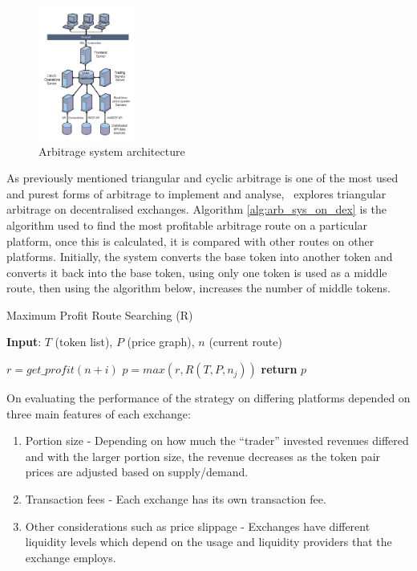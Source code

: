\begin{figure}[!htb]
    \centering
    \includegraphics[width=0.28\textwidth]{background/Images/Arbitrage-Architecture.png}
    \caption{Arbitrage system architecture~\cite{PAUNACristian2018ATSf}}
\end{figure}

\noindent  As previously mentioned triangular and cyclic arbitrage is one of the most used and purest forms of arbitrage to implement and analyse,~\cite{boonpeam2021arbitrage} explores triangular arbitrage on decentralised exchanges. Algorithm \ref{alg:arb_sys_on_dex} is the algorithm used to find the most profitable arbitrage route on a particular platform, once this is calculated, it is compared with other routes on other platforms. Initially, the system converts the base token into another token and converts it back into the base token, using only one token is used as a middle route, then using the algorithm below, increases the number of middle tokens.

\begin{algorithm}
    \caption{Maximum Profit Route Searching (R)}\label{alg:arb_sys_on_dex}
    \textbf{Input}: $T$ (token list), $P$ (price graph), $n$ (current route)
    \begin{algorithmic}
        \State $r = get\_profit(n+i)$
        \State $p = max(r, R(T, P, n_j))$
        \EndFor
        \EndFor
        \State \textbf{return} $p$
    \end{algorithmic}
\end{algorithm}

\noindent On evaluating the performance of the strategy on differing platforms depended on three main features of each exchange:
\begin{enumerate}
    \item Portion size - Depending on how much the ``trader'' invested revenues differed and with the larger portion size, the revenue decreases as the token pair prices are adjusted based on supply/demand.
    \item Transaction fees - Each exchange has its own transaction fee.
    \item Other considerations such as price slippage - Exchanges have different liquidity levels which depend on the usage and liquidity providers that the exchange employs.
\end{enumerate}

